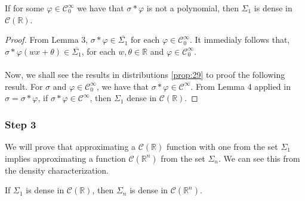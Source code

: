 \documentclass[../main.tex]{subfiles}
\begin{document}
\vspace{\baselineskip} 
	\begin{prop} %
		If for some $\varphi \in \mathcal{C}^\infty_0 $ we have that $\sigma \ast \varphi $ is not a polynomial, then $\Sigma_1$ is dense in $\mathcal{C}(\mathbb{R})$.
	\end{prop}
	 \begin{proof}
	 From Lemma 3, $\sigma \ast \varphi \in  \overline{\Sigma_1}$ for each $\varphi \in \mathcal{C}^\infty_0$. It immedialy follows that, $\sigma \ast \varphi (wx+\theta ) \in  \overline{\Sigma_1}$, for each $ w, \theta \in \mathbb{R}$ and $\varphi \in \mathcal{C}^\infty_0$.\\ \\
	 Now, we shall see the results in distributions \ref{prop:29} to proof the following result. For $\sigma$ and $\varphi \in \mathcal{C}^\infty_0$, we have that $\sigma \ast \varphi \in  \mathcal{C}^\infty $.
	 From Lemma 4 applied in $\sigma= \sigma \ast \varphi$, if $\sigma \ast \varphi \in  \mathcal{C}^\infty $, then $\Sigma_1$ dense in $\mathcal{C} (\mathbb{R})$. 
	 \end{proof}
\vspace{\baselineskip} 
\subsubsection{Step 3}
\noindent We will prove that approximating a $\mathcal{C}(\mathbb{R})$ function  with one from the set $\Sigma_1$ implies approximating a function $\mathcal{C}(\mathbb{R}^n)$ from the set $\Sigma_n$. We can see this from the density characterization.

	\begin{prop}  %
			If $\Sigma_1$ is dense in $\mathcal{C}(\mathbb{R})$, then $\Sigma_n$ is dense in $\mathcal{C}(\mathbb{R}^n)$. 
		\end{prop}
	
\end{document}
